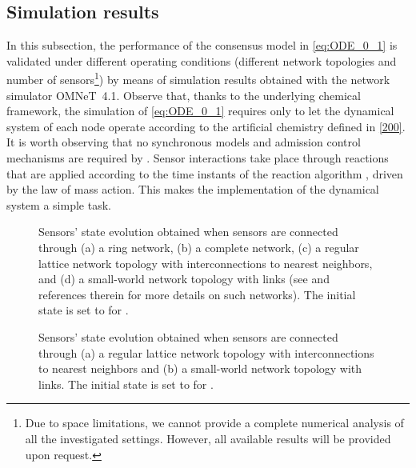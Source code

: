 \documentclass[journal]{IEEEtran}
\begin{document}
\subsection{Simulation results}

{{In this subsection}, the performance of the consensus model in \eqref{eq:ODE_0_1} is validated under different operating conditions (different network topologies and number  of sensors\footnote{Due to space limitations, we cannot provide a complete numerical analysis of all the investigated settings. However, all available results will be provided upon request.}) by means of simulation results obtained with the network simulator OMNeT~4.1.} 
{Observe that, thanks to the underlying chemical framework, the simulation of \eqref{eq:ODE_0_1} requires only to let the dynamical system of each node  operate according to the artificial chemistry {defined in \eqref{200}}. It is worth observing that no synchronous models and admission control mechanisms are required by . Sensor interactions take place through reactions that are applied according to the time instants of the reaction algorithm , driven by the law of mass action. This makes the implementation of the dynamical system a simple task.}

\begin{figure}[t]
 \centering
\caption{{Sensors' state evolution obtained when  sensors are connected through (a) a ring network, (b) a complete network, (c) a regular lattice network topology with interconnections to  nearest neighbors, and (d) a small-world network topology with  links (see \cite{OlFa07} and references therein for more details on such networks). The initial state is set to  for .}}
\label{fig:forComparison_2}
\end{figure}

\begin{figure}[t]
 \centering
\caption{{Sensors' state evolution obtained when  sensors are connected through (a) a regular lattice network topology with interconnections to  nearest neighbors and (b) a small-world network topology with  links. The initial state is set to  for .}}
\label{fig:forComparison}
\end{figure}
\end{document}
